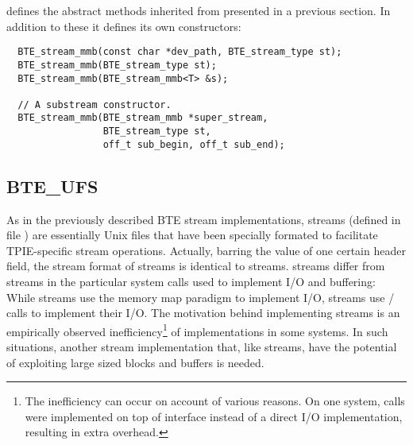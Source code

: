  defines the abstract methods inherited from
 presented in a previous section. In addition to these it defines its own
constructors:
\begin{verbatim}
  BTE_stream_mmb(const char *dev_path, BTE_stream_type st); 
  BTE_stream_mmb(BTE_stream_type st); 
  BTE_stream_mmb(BTE_stream_mmb<T> &s); 
  
  // A substream constructor.
  BTE_stream_mmb(BTE_stream_mmb *super_stream,
                 BTE_stream_type st,
                 off_t sub_begin, off_t sub_end);
\end{verbatim}

\subsection{BTE\_UFS}

\tobeextended

As in the previously described BTE stream implementations, 
streams (defined in file ) are essentially Unix
files that have been specially formated to facilitate TPIE-specific stream
operations. Actually, barring the value of one certain header field, the
stream format of  streams is identical to 
streams.  streams differ from  streams in the
particular system calls used to implement I/O and buffering: While
 streams use the memory map paradigm to implement I/O,
 streams use / calls to implement
their I/O. The motivation behind implementing  streams is an
empirically observed inefficiency\footnote{The inefficiency can occur on
account of various reasons. On one system,  calls were
implemented on top of  interface instead of a direct I/O
implementation, resulting in extra overhead.} of 
implementations in some systems. In such
situations, another stream implementation that, like 
streams, have the potential of exploiting large sized blocks and buffers is
needed.

